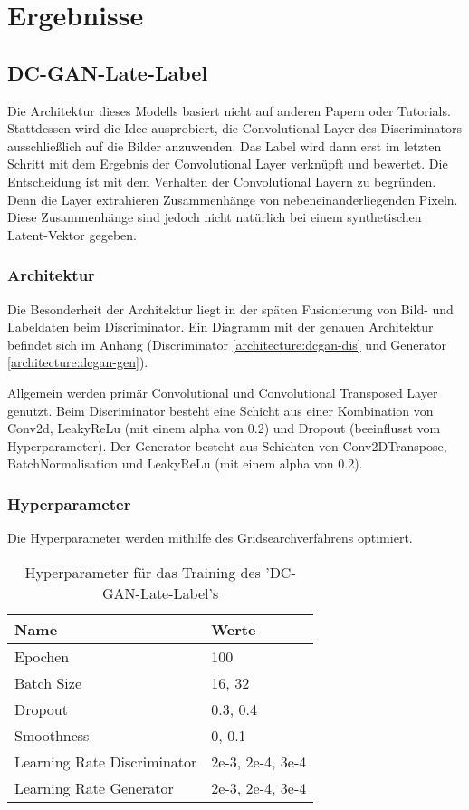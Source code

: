 
\chapter{Ergebnisse}

\section{DC-GAN-Late-Label}
\label{section:dc-gan-late-label}
Die Architektur dieses Modells basiert nicht auf anderen Papern oder Tutorials. 
Stattdessen wird die Idee ausprobiert, die Convolutional Layer des Discriminators ausschließlich auf die Bilder anzuwenden.
Das Label wird dann erst im letzten Schritt mit dem Ergebnis der Convolutional Layer verknüpft und bewertet.
Die Entscheidung ist mit dem Verhalten der Convolutional Layern zu begründen.
Denn die Layer extrahieren Zusammenhänge von nebeneinanderliegenden Pixeln.
Diese Zusammenhänge sind jedoch nicht natürlich bei einem synthetischen Latent-Vektor gegeben.

\subsection{Architektur}
Die Besonderheit der Architektur liegt in der späten Fusionierung von Bild- und Labeldaten beim Discriminator.
Ein Diagramm mit der genauen Architektur befindet sich im Anhang (Discriminator \cref{architecture:dcgan-dis} und Generator \cref{architecture:dcgan-gen}).


Allgemein werden primär Convolutional und Convolutional Transposed Layer genutzt.
Beim Discriminator besteht eine Schicht aus einer Kombination von Conv2d, LeakyReLu (mit einem alpha von 0.2) und Dropout (beeinflusst vom Hyperparameter).
Der Generator besteht aus Schichten von Conv2DTranspose, BatchNormalisation und LeakyReLu (mit einem alpha von 0.2).

\subsection{Hyperparameter}
Die Hyperparameter werden mithilfe des Gridsearchverfahrens optimiert.
\begin{table}[H]
	\centering
	\begin{tabular}{l l}
		Name                        & Werte            \\ \hline
		Epochen                     & 100              \\
		Batch Size                  & 16, 32           \\
		Dropout                     & 0.3, 0.4         \\
		Smoothness                  & 0, 0.1           \\
		Learning Rate Discriminator & 2e-3, 2e-4, 3e-4 \\
		Learning Rate Generator     & 2e-3, 2e-4, 3e-4
	\end{tabular}
	\caption{Hyperparameter für das Training des 'DC-GAN-Late-Label's}
\end{table}

